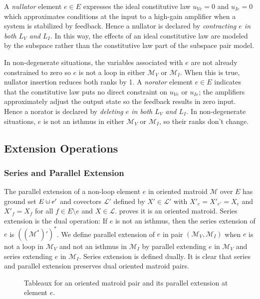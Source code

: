 \documentclass{amsproc-sunycstr}
\theoremstyle{plain}
\theoremstyle{definition}
\theoremstyle{remark}
\newcommand{\dunion}
{\mbox{\hbox{\hskip4pt$\cdot$\hskip-4.62pt$\cup$\hskip2pt}}}
\begin{document}
A \textit{nullator} element $e\in E$ 
expresses the ideal constitutive law $u_{Ve}=0$
and $u_{Ie}=0$ which approximates conditions at the input
to a high-gain amplifier when a system is stabilized by feedback.
Hence a nullator is declared by 
\textit{contracting $e$ in both
$L_V$ and $L_I$.}  
In this way, the effects of an ideal constitutive law are modeled by
the subspace rather than the constitutive law part of the subspace
pair model.

In non-degenerate situations, the variables associated with $e$ are
not already constrained to zero so $e$ is not a loop in 
either $\mathcal{M}_V$ or $\mathcal{M}_I$.  When this is true,
nullator insertion reduces both ranks by 1.
%
A \textit{norator} element $e\in E$ indicates that the constitutive
law puts no direct constraint on $u_{Ve}$ or $u_{Ie}$; the amplifiers
approximately adjust the output state so the feedback results in zero input.
Hence a norator is declared by 
\textit{deleting $e$ in both
$L_V$ and $L_I$.}
In non-degenerate situations, $e$ is not an isthmus 
in either $\mathcal{M}_V$ or $\mathcal{M}_I$, so their ranks don't change.



\subsection{Extension Operations}


\subsubsection{Series and Parallel Extension}

The parallel extension of a non-loop element $e$ in oriented matroid
$\mathcal{M}$ over $E$ has ground set $E\dunion e'$ 
and covectors $\mathcal{L}'$ defined by $X'\in\mathcal{L}'$
with $X'_e=X'_{e'}=X_e$ and $X'_f=X_f$ for all $f\in E\setminus e$
and $X\in\mathcal{L}$.  \cite[p.??]{OMBOOK} proves it is an oriented 
matroid.  Series extension is the dual operation:  If
$e$ is not an isthmus, then the series extension of $e$ is
$((\mathcal{M}^*)')^*$. 
We define parallel extension of $e$ in 
pair $(\mathcal{M}_V,\mathcal{M}_I)$ when $e$ is not a loop
in $\mathcal{M}_V$ and not an isthmus in 
$\mathcal{M}_I$ by parallel extending $e$ in $\mathcal{M}_V$
and series extending $e$ in $\mathcal{M}_I$.  Series extension 
is defined dually.  It is clear that series and parallel extension
preserves dual oriented matroid pairs.  

\begin{figure}

\caption{Tableaux for an oriented matroid pair and its parallel extension
at element $e$.}
\end{figure}
\end{document}

